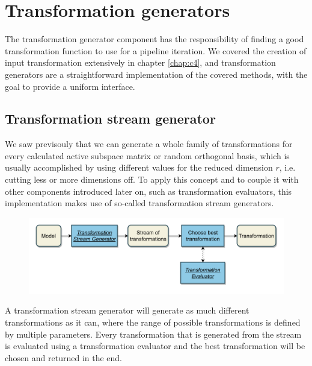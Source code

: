 \documentclass[
  a4paper,  %
  twoside,  %
  bibliography=totoc,
  headsepline,
  cleardoublepage=empty,
  parskip=half,
  draft=false
]{scrbook}
\begin{document}
\newpage
\section {Transformation generators}
\label{sec:tg}

The transformation generator component has the responsibility of finding a good transformation function to use for a pipeline iteration.
We covered the creation of input transformation extensively in chapter \cref{chap:c4}, and transformation generators are a straightforward implementation of the covered methods, with the goal to provide a uniform interface.

\subsection {Transformation stream generator}

We saw previsouly that we can generate a whole family of transformations for every calculated active subspace matrix or random orthogonal basis, which is usually accomplished by using different values for the reduced dimension $r$, i.e. cutting less or more dimensions off.
To apply this concept and to couple it with other components introduced later on, such as transformation evaluators, this implementation makes use of so-called transformation stream generators.

\begin{mdframed}[style=style,frametitle={Transformation generator (stream-based)}]
\begin{figure}[H]
\includegraphics[width=\textwidth]{graphics/TransformationGen_Stream.pdf}
\delimit

\end{figure}
\end{mdframed}

A transformation stream generator will generate as much different transformations as it can, where the range of possible transformations is defined by multiple parameters.
Every transformation that is generated from the stream is evaluated using a transformation evaluator and the best transformation will be chosen and returned in the end.
\end{document}
